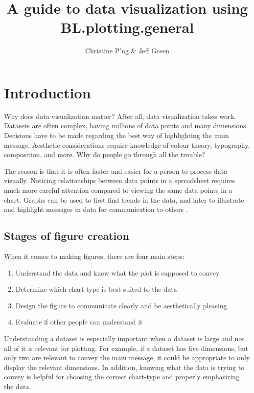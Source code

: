 \documentclass[letterpaper]{report}\usepackage[]{graphicx}\usepackage[]{color}
\title{A guide to data visualization using BL.plotting.general}
\author{Christine P'ng \& Jeff Green}
\begin{document}
\maketitle

\tableofcontents

\section{Introduction}
Why does data visualization matter? After all, data visualization takes work. Datasets are often complex, having millions of data points and many dimensions. Decisions have to be made regarding the best way of highlighting the main message. Aesthetic considerations require knowledge of colour theory, typography, composition, and more. Why do people go through all the trouble?

The reason is that it is often faster and easier for a person to process data visually. Noticing relationships between data points in a spreadsheet requires much more careful attention compared to viewing the same data points in a chart. Graphs can be used to first find trends in the data, and later to illustrate and highlight messages in data for communication to others \cite{Anscombe, wong-dataexploration}.

\subsection{Stages of figure creation}
When it comes to making figures, there are four main steps:
\begin{enumerate}
\item Understand the data and know what the plot is supposed to convey
\item Determine which chart-type is best suited to the data
\item Design the figure to communicate clearly and be aesthetically pleasing
\item Evaluate if other people can understand it
\end{enumerate}

Understanding a dataset is especially important when a dataset is large and not all of it is relevant for plotting. For example, if a dataset has five dimensions, but only two are relevant to convey the main message, it could be appropriate to only display the relevant dimensions. In addition, knowing what the data is trying to convey is helpful for choosing the correct chart-type and properly emphasizing the data. 
\end{document}
